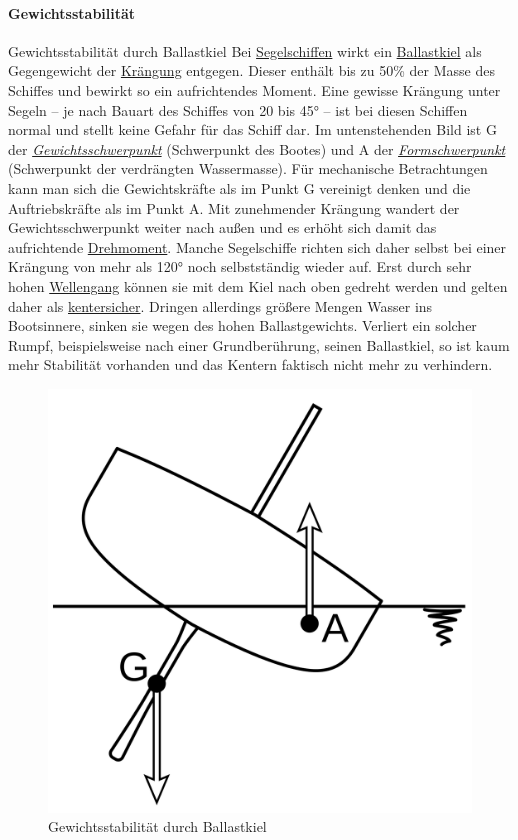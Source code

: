 \paragraph{Gewichtsstabilität}
Gewichtsstabilität durch Ballastkiel
Bei \href{https://de.wikipedia.org/wiki/Segelschiff}{Segelschiffen} wirkt ein \href{https://de.wikipedia.org/wiki/Kiel_(Schiffbau)}{Ballastkiel} als Gegengewicht der \href{https://de.wikipedia.org/wiki/Kr\%C3\%A4ngung}{Krängung} entgegen. Dieser enthält bis zu 50\% der Masse des Schiffes und bewirkt so ein aufrichtendes Moment. Eine gewisse Krängung unter Segeln – je nach Bauart des Schiffes von 20 bis 45° – ist bei diesen Schiffen normal und stellt keine Gefahr für das Schiff dar. Im untenstehenden Bild ist G der \textit{\href{https://de.wikipedia.org/wiki/Gewichtsschwerpunkt}{Gewichtsschwerpunkt}} (Schwerpunkt des Bootes) und A der \textit{\href{https://de.wikipedia.org/wiki/Formschwerpunkt}{Formschwerpunkt}} (Schwerpunkt der verdrängten Wassermasse). Für mechanische Betrachtungen kann man sich die Gewichtskräfte als im Punkt G vereinigt denken und die Auftriebskräfte als im Punkt A. Mit zunehmender Krängung wandert der Gewichtsschwerpunkt weiter nach außen und es erhöht sich damit das aufrichtende \href{https://de.wikipedia.org/wiki/Drehmoment}{Drehmoment}. Manche Segelschiffe richten sich daher selbst bei einer Krängung von mehr als 120° noch selbstständig wieder auf. Erst durch sehr hohen \href{https://de.wikipedia.org/wiki/Seegang}{Wellengang} können sie mit dem Kiel nach oben gedreht werden und gelten daher als \href{https://de.wikipedia.org/wiki/Kentern}{kentersicher}. Dringen allerdings größere Mengen Wasser ins Bootsinnere, sinken sie wegen des hohen Ballastgewichts. Verliert ein solcher Rumpf, beispielsweise nach einer Grundberührung, seinen Ballastkiel, so ist kaum mehr Stabilität vorhanden und das Kentern faktisch nicht mehr zu verhindern. 
\begin{figure}
    \centering
    \includegraphics[width=0.5\linewidth]{Segeln_Gewichtsstabilitaet.svg.png}
    \caption{Gewichtsstabilität durch Ballastkiel }
    \label{fig:enter-label}
\end{figure}

